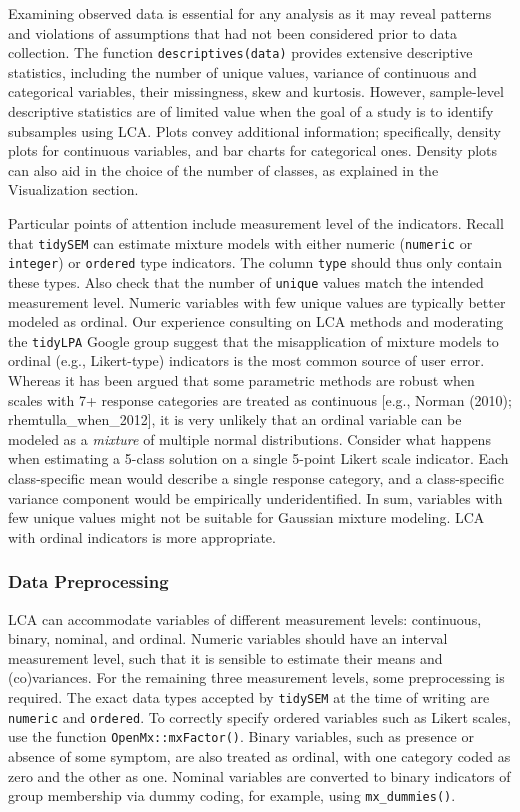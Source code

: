 \documentclass[
  ,man,floatsintext]{apa6}
\begin{document}
Examining observed data is essential for any analysis as it may reveal
patterns and violations of assumptions that had not been considered
prior to data collection.
The function \texttt{descriptives(data)} provides extensive descriptive statistics,
including the number of unique values,
variance of continuous and categorical variables,
their missingness, skew and kurtosis.
However, sample-level descriptive statistics are of limited value when the goal of a study is to identify subsamples using LCA.
Plots convey additional information; specifically, density plots for continuous variables, and bar charts
for categorical ones.
Density plots can also aid in the choice of the number of classes, as explained in the Visualization section.

Particular points of attention include measurement level of the indicators.
Recall that \texttt{tidySEM} can estimate mixture models with either numeric (\texttt{numeric} or \texttt{integer}) or \texttt{ordered} type indicators.
The column \texttt{type} should thus only contain these types.
Also check that the number of \texttt{unique} values match the intended measurement level.
Numeric variables with few unique values are typically better modeled as ordinal.
Our experience consulting on LCA methods
and moderating the \texttt{tidyLPA} Google group suggest that the
misapplication of mixture models to ordinal (e.g., Likert-type)
indicators is the most common source of user error. Whereas it has been
argued that some parametric methods are robust when scales with 7+
response categories are treated as continuous {[}e.g., Norman (2010); rhemtulla\_when\_2012{]},
it is very unlikely
that an ordinal variable can be modeled as a \emph{mixture} of multiple
normal distributions.
Consider what happens when estimating a 5-class solution on a single 5-point Likert scale indicator.
Each class-specific mean would describe a single response
category,
and a class-specific variance component would be empirically underidentified.
In sum, variables with few unique values might not be suitable for Gaussian mixture modeling.
LCA with ordinal indicators is more appropriate.

\hypertarget{data-preprocessing}{%
\subsubsection{Data Preprocessing}\label{data-preprocessing}}

LCA can accommodate variables of different measurement levels: continuous, binary, nominal, and ordinal.
Numeric variables should have an interval measurement level,
such that it is sensible to estimate their means and (co)variances.
For the remaining three measurement levels,
some preprocessing is required.
The exact data types accepted by \texttt{tidySEM} at the time of writing are \texttt{numeric} and \texttt{ordered}.
To correctly specify ordered variables
such as Likert scales,
use the function \texttt{OpenMx::mxFactor()}.
Binary variables,
such as presence or absence of some symptom, are also treated as ordinal, with one category coded as zero and the other as one.
Nominal variables are converted to binary indicators of group membership via dummy coding, for example, using \texttt{mx\_dummies()}.
\end{document}
